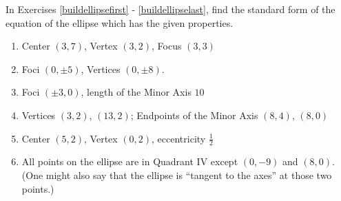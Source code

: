 \documentclass{ximera}
\begin{document}
In Exercises \ref{buildellipsefirst} - \ref{buildellipselast},  find the standard form of the equation of the ellipse which has the given properties.

\begin{enumerate}
\setcounter{enumi}{\value{HW}}

\item Center $(3, 7)$, Vertex $(3, 2)$, Focus $(3, 3)$  \label{buildellipsefirst}
\item Foci $(0, \pm 5)$, Vertices $(0, \pm 8)$.
\item Foci $(\pm 3, 0)$, length of the Minor Axis $10$
\item Vertices $(3,2)$, $(13,2)$; Endpoints of the Minor Axis $(8,4)$, $(8,0)$
\item Center $(5,2)$, Vertex $(0,2)$, eccentricity $\frac{1}{2}$
\item All points on the ellipse are in Quadrant IV except $(0, -9)$ and $(8, 0)$.  (One might also say that the ellipse is ``tangent to the axes'' at those two points.)  \label{buildellipselast}

\setcounter{HW}{\value{enumi}}
\end{enumerate}
\end{document}
